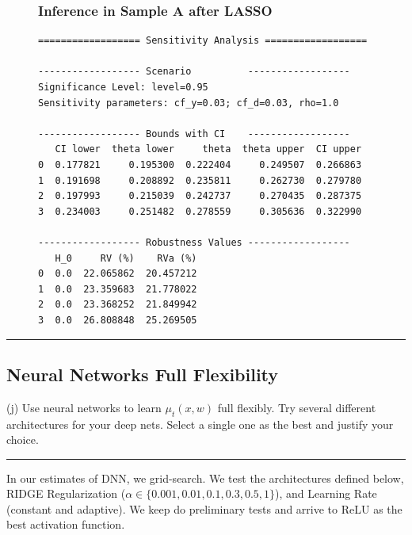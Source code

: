 \documentclass{article}
\newenvironment{colorparagraph}[1]{\par\color{#1}}{\par}
\begin{document}
\begin{figure}[H]
  \subsubsection*{Inference in Sample A after LASSO}
  \begin{lstlisting}[style=RstyleCommentSmall, caption=Sensitivity Analysis in Random Forest Estimate]
================== Sensitivity Analysis ==================

------------------ Scenario          ------------------
Significance Level: level=0.95
Sensitivity parameters: cf_y=0.03; cf_d=0.03, rho=1.0

------------------ Bounds with CI    ------------------
   CI lower  theta lower     theta  theta upper  CI upper
0  0.177821     0.195300  0.222404     0.249507  0.266863
1  0.191698     0.208892  0.235811     0.262730  0.279780
2  0.197993     0.215039  0.242737     0.270435  0.287375
3  0.234003     0.251482  0.278559     0.305636  0.322990

------------------ Robustness Values ------------------
   H_0     RV (%)    RVa (%)
0  0.0  22.065862  20.457212
1  0.0  23.359683  21.778022
2  0.0  23.368252  21.849942
3  0.0  26.808848  25.269505
  \end{lstlisting}
\end{figure}

\begin{colorparagraph}{questioncolor}
\label{q3j}
\rule{\textwidth}{0.5pt}
\subsection{Neural Networks Full Flexibility}
(j) Use neural networks to learn \( \mu_t(x, w) \) full flexibly. Try several different architectures for your deep nets. Select a single one as the best and justify your choice.

\rule{\textwidth}{0.5pt}
\end{colorparagraph}

\begin{table}[H]
  \centering
  
  \label{tab:summary_of_validation_loss_by_architecture}
\end{table}

In our estimates of DNN, we grid-search. We test the architectures defined below, RIDGE Regularization ($\alpha \in \{0.001, 0.01, 0.1, 0.3, 0.5, 1\}$), and Learning Rate (constant and adaptive). We keep do preliminary tests and arrive to ReLU as the best activation function.
\end{document}
